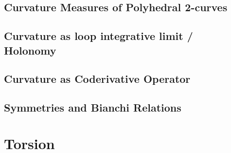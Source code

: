 \documentclass[a4paper]{book}
\numberwithin{equation}{chapter}
\begin{document}
\subsection{Curvature Measures of Polyhedral 2-curves}
\subsection{Curvature as loop integrative limit / Holonomy}
\subsection{Curvature as Coderivative Operator}
\subsection{Symmetries and Bianchi Relations}

\section{Torsion}










    
    
\end{document}
